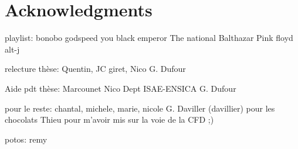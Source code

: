 

\chapter{Acknowledgments}

playlist:
bonobo
godspeed you black emperor
The national
Balthazar
Pink floyd
alt-j

relecture thèse:
Quentin,
JC giret,
Nico
G. Dufour

Aide pdt thèse:
Marcounet
Nico
Dept ISAE-ENSICA
G. Dufour

pour le reste:
chantal, michele, marie, nicole
G. Daviller (davillier) pour les chocolats
Thieu pour m'avoir mis sur la voie de la CFD ;)

potos:
remy